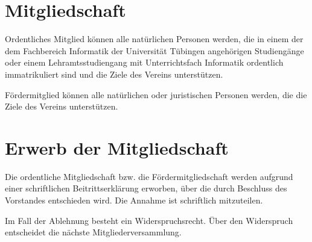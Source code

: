\section{Mitgliedschaft}
	\begin{myEnum}
		\item Ordentliches Mitglied können alle natürlichen Personen werden, die in einem der dem Fachbereich Informatik der Universität Tübingen angehörigen Studiengänge oder einem Lehramtsstudiengang mit Unterrichtsfach Informatik ordentlich immatrikuliert sind und die Ziele des Vereins unterstützen.
		\item Fördermitglied können alle natürlichen oder juristischen Personen werden, die die Ziele des Vereins unterstützen.
	\end{myEnum}

\section{Erwerb der Mitgliedschaft}
	\begin{myEnum}
		\item Die ordentliche Mitgliedschaft bzw. die Fördermitgliedschaft werden aufgrund einer schriftlichen Beitrittserklärung erworben, über die durch Beschluss des Vorstandes entschieden wird. Die Annahme ist schriftlich mitzuteilen.
		\item Im Fall der Ablehnung besteht ein Widerspruchsrecht. Über den Widerspruch entscheidet die nächste Mitgliederversammlung.
	\end{myEnum}

